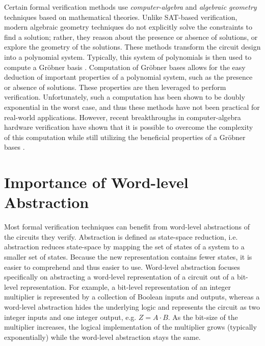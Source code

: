 Certain formal verification methods use \emph{computer-algebra} and \emph{algebraic
geometry} techniques based on mathematical theories.
Unlike SAT-based verification, modern algebraic geometry 
techniques do not explicitly solve the constraints to find a solution; 
rather, they reason about the presence or absence of solutions, or explore
the geometry of the solutions.
These methods \cite{Avrunin:CAV} \cite{condrat-tacas07} \cite{gbverify:2007} 
transform the circuit design into a polynomial system. Typically, this system
of polynomials is then used to compute a Gr\"obner basis \cite{gb_book}. 
Computation of Gr\"obner bases allows for 
the easy deduction of important properties of a polynomial system, 
such as the presence or absence of 
solutions. These properties are then leveraged to perform 
verification. Unfortunately, such a computation 
has been shown to be doubly 
exponential in the worst case, and thus these methods have not been 
practical for real-world applications. However, recent
breakthroughs in computer-algebra hardware verification have shown
that it is possible to overcome the complexity of this computation while
still utilizing the beneficial properties of a Gr\"obner bases
\cite{lv:phd}.

\section{Importance of Word-level Abstraction}
Most formal verification techniques can benefit from word-level abstractions 
of the circuits they verify.
Abstraction is defined as state-space reduction, i.e{\text . }abstraction
reduces state-space by mapping the set of states of a system to a smaller 
set of states. Because the new representation contains fewer states, it
is easier to comprehend and thus easier to use. 
Word-level abstraction focuses specifically on abstracting a word-level
representation of a circuit out of a bit-level representation. For example,
a bit-level representation of an integer multiplier is represented by a
collection of Boolean inputs and outputs, whereas a word-level
abstraction hides the underlying logic and represents the circuit as two 
integer inputs and one integer output, e.g. $Z=A\cdot B$. As the bit-size of the
multiplier increases, the logical implementation of the multiplier grows (typically
exponentially) while the word-level abstraction stays the same.

